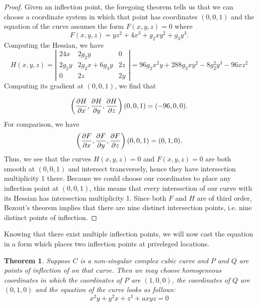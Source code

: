 \documentclass[12pt]{article}
\newtheorem{thm}{Theorem}
\begin{document}
\begin{proof}
Given an inflection point, the foregoing theorem tells us
that we can choose a coordinate system in which that point
has coordinates $(0,0,1)$ and the equation of the curve
assumes the form $F(x,y,z) = 0$ where
\[
 F(x,y,z) = y z^2 + 4 x^3 + g_2 x y^2 + g_3 y^3 .
\]
Computing the Hessian, we have
\[
 H(x,y,z) = \left| 
   \begin{matrix}
        24 x  &      2 g_2 y      & 0   \\
      2 g_2 y & 2 g_2 x + 6 g_3 y & 2 z \\
         0    &        2 z        & 2 y
   \end{matrix} \right| =
 96 g_2 x^2 y + 288 g_3 x y^2 - 8 g_2^2 y^3 - 96 x z^2
\]
Computing its gradient at $(0,0,1)$, we find that

\[
 \left( {\partial H \over \partial x},
        {\partial H \over \partial y},
        {\partial H \over \partial z} \right) (0,0,1) =
 (-96, 0, 0) .
\] 
For comparison, we have
\[
 \left( {\partial F \over \partial x},
        {\partial F \over \partial y},
        {\partial F \over \partial z} \right) (0,0,1) =
 (0, 1, 0) .
\] 
Thus, we see that the curves $H(x,y,z) = 0$ and
$F(x,y,z) = 0$ are both smooth at $(0,0,1)$ and
intersect transversely, hence they have intersection
multiplicity 1 there.  Because we could choose our 
coordinates to place any inflection point at
$(0,0,1)$, this means that every intersection of
our curve with its Hessian has intersection
multiplicity 1.  Since both $F$ and $H$ are of
third order, Bezout's theorem implies that there
are nine distinct intersection points, i.e. nine
distinct points of inflection.
\end{proof}

Knowing that there exist multiple inflection points,
we will now cast the equation in a form which places
two inflection points at priveleged locations.

\begin{thm}
Suppose $C$ is a non-singular complex cubic curve and $P$ 
and $Q$ are points of inflection of on that curve.  Then we 
may choose homogeneous coordinates in which the coordinates 
of $P$ are $(1,0,0)$, the coordinates of $Q$ are $(0,1,0)$ 
and the equation of the curve looks as follows:
\[
 x^2 y + y^2 x + z^3 + a x y z = 0
\]
\end{thm}
\end{document}
